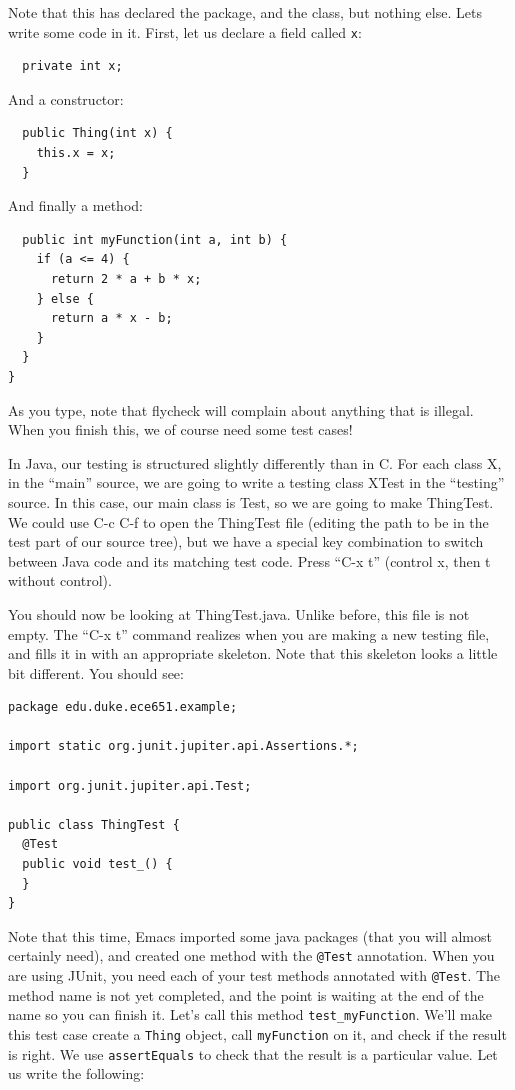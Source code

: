 \documentclass[12pt]{article}
\begin{document}
Note that this has declared the package, and the class, but nothing else.
Lets write some code in it.  First, let us declare a field called \verb+x+:
\begin{verbatim}
  private int x;
\end{verbatim}
And a constructor:
\begin{verbatim}
  public Thing(int x) {
    this.x = x;
  }
\end{verbatim}
And finally a method:
\begin{verbatim}
  public int myFunction(int a, int b) {
    if (a <= 4) {
      return 2 * a + b * x;
    } else {
      return a * x - b;
    }
  }
}
\end{verbatim}

As you type, note that flycheck will complain about anything that is illegal.
When you finish this, we of course need some test cases!

In Java, our testing is structured slightly differently than in C.
For each class X, in the ``main'' source, we are going to write a
testing class XTest in the ``testing'' source.  In this case, our main
class is Test, so we are going to make ThingTest.  We could use C-c
C-f to open the ThingTest file (editing the path to be in the test
part of our source tree), but we have a special key combination to
switch between Java code and its matching test code. Press ``C-x t''
(control x, then t without control).

You should now be looking at ThingTest.java.  Unlike before, this file
is not empty.  The ``C-x t'' command realizes when you are making a new
testing file, and fills it in with an appropriate skeleton.  Note
that this skeleton looks a little bit different. You should see:

\begin{verbatim}
package edu.duke.ece651.example;

import static org.junit.jupiter.api.Assertions.*;

import org.junit.jupiter.api.Test;

public class ThingTest {
  @Test 
  public void test_() {
  }
}
\end{verbatim}


Note that this time, Emacs imported some java packages (that you will
almost certainly need), and created one method with the \verb+@Test+
annotation. When you are using JUnit, you need each of your test
methods annotated with \verb+@Test+.   The method name is not yet completed,
and the point is waiting at the end of the name so you can finish it.
Let's call this method \verb+test_myFunction+.  We'll make this
test case create a \verb+Thing+ object, call \verb+myFunction+ on it,
and check if the result is right.  We use \verb+assertEquals+ to
check that the result is a particular value.  Let us
write the following:
\end{document}
